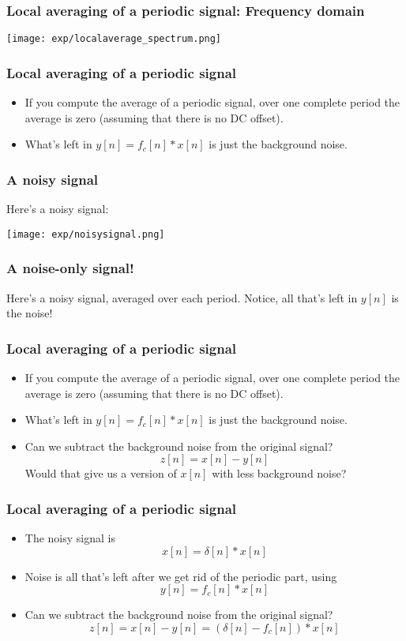 \documentclass{beamer}
\begin{document}
\begin{frame}
  \frametitle{Local averaging of a periodic signal: Frequency domain}

  \centerline{\texttt{[image: exp/localaverage\_spectrum.png]}}
\end{frame}

\begin{frame}
  \frametitle{Local averaging of a periodic signal}

  \begin{itemize}
  \item If you compute the average of a periodic signal, over one complete period
    the average is zero (assuming that there is no DC offset).
  \item What's left in $y[n]=f_c[n]\ast x[n]$ is just the background noise.
  \end{itemize}
\end{frame}

\begin{frame}
  \frametitle{A noisy signal}

  Here's a noisy signal:
  \centerline{\texttt{[image: exp/noisysignal.png]}}
\end{frame}

\begin{frame}
  \frametitle{A noise-only signal!}

  Here's a noisy signal, averaged over each period.  Notice, all that's left in $y[n]$ is the noise!
  \centerline{}
\end{frame}

\begin{frame}
  \frametitle{Local averaging of a periodic signal}

  \begin{itemize}
  \item If you compute the average of a periodic signal, over one complete period
    the average is zero (assuming that there is no DC offset).
  \item What's left in $y[n]=f_c[n]\ast x[n]$ is just the background noise.
  \item Can we subtract the background noise from the original signal?
    \[
    z[n] = x[n] - y[n]
    \]
    Would that give us a version of $x[n]$ with less background noise?
  \end{itemize}
\end{frame}

\begin{frame}
  \frametitle{Local averaging of a periodic signal}

  \begin{itemize}
  \item The noisy signal is
    \[
    x[n] = \delta[n]\ast x[n]
    \]
  \item Noise is all that's left after we get rid of the periodic part, using
    \[
    y[n]=f_c[n]\ast x[n]
    \]
  \item Can we subtract the background noise from the original signal?
    \[
    z[n] = x[n] - y[n] = (\delta[n]-f_c[n])\ast x[n]
    \]
  \end{itemize}
\end{frame}
\end{document}
